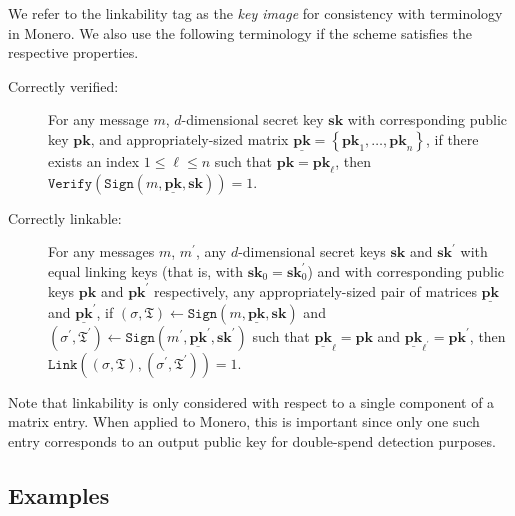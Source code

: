 \documentclass{mrl}
\theoremstyle{plain}
\theoremstyle{definition}
\begin{document}
We refer to the linkability tag as the \textit{key image} for consistency with terminology in Monero. We also use the following terminology if the scheme satisfies the respective properties.
\begin{description}
\item[Correctly verified:] For any message $m$, $d$-dimensional secret key $\textbf{sk}$ with corresponding public key $\textbf{pk}$, and appropriately-sized matrix $\underline{\textbf{pk}} = \left\{\textbf{pk}_1, \ldots, \textbf{pk}_n\right\}$, if there exists an index $1 \leq \ell \leq n$ such that $\textbf{pk} = \textbf{pk}_\ell$, then $\texttt{Verify}(\texttt{Sign}(m, \underline{\textbf{pk}}, \textbf{sk})) = 1$.

\item[Correctly linkable:] For any messages $m$, $m^\prime$, any $d$-dimensional secret keys  $\textbf{sk}$ and $\textbf{sk}^\prime$ with equal linking keys (that is, with $\textbf{sk}_0 = \textbf{sk}^\prime_0$) and with corresponding public keys $\textbf{pk}$ and $\textbf{pk}^\prime$ respectively, any appropriately-sized pair of matrices $\underline{\textbf{pk}}$ and $\underline{\textbf{pk}}^\prime$, if $(\sigma, \mathfrak{T}) \leftarrow \texttt{Sign}(m, \underline{\textbf{pk}}, \textbf{sk})$ and $(\sigma^\prime, \mathfrak{T}^\prime) \leftarrow \texttt{Sign}(m^\prime, \underline{\textbf{pk}}^\prime, \textbf{sk}^\prime)$ such that $\underline{\textbf{pk}}_\ell = \textbf{pk}$ and $\underline{\textbf{pk}}_{\ell^\prime} = \textbf{pk}^\prime$, then
$\texttt{Link}((\sigma, \mathfrak{T}), (\sigma^\prime, \mathfrak{T}^\prime))=1$.
\end{description}

Note that linkability is only considered with respect to a single component of a matrix entry. When applied to Monero, this is important since only one such entry corresponds to an output public key for double-spend detection purposes.



\subsection{Examples}
\end{document}

